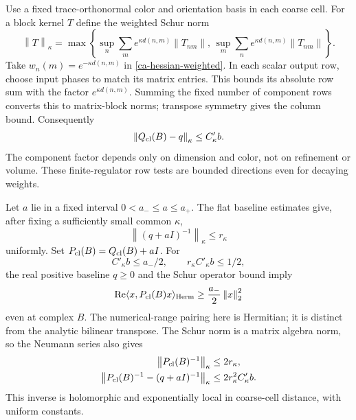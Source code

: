\documentclass[11pt]{article}
\theoremstyle{remark}
\newcommand{\norm}[1]{\left\|#1\right\|}
\begin{document}
Use a fixed trace-orthonormal color and orientation basis in
each coarse cell. For a block kernel $T$ define the weighted
Schur norm
\begin{equation}\label{ca-schur}
 \norm T_\kappa=\max\left\{
   \sup_n\sum_m e^{\kappa d(n,m)}\norm{T_{nm}},\,
   \sup_m\sum_n e^{\kappa d(n,m)}\norm{T_{nm}}\right\}.
\end{equation}
Take $w_n(m)=e^{-\kappa d(n,m)}$ in
\eqref{ca-hessian-weighted}. In each scalar output row,
choose input phases to match its matrix entries. This bounds
its absolute row sum with the factor $e^{\kappa d(n,m)}$.
Summing the fixed number of component rows converts this to
matrix-block norms; transpose symmetry gives the column bound.
Consequently
\begin{equation}\label{ca-hessian-schur}
 \norm{Q_{\rm cl}(B)-q}_\kappa\le C'_{\kappa}b.
\end{equation}
The component factor depends only on dimension and color,
not on refinement or volume. These finite-regulator row tests
are bounded directions even for decaying weights.

Let $a$ lie in a fixed interval $0<a_-\le a\le a_+$.
The flat baseline estimates give, after fixing a sufficiently
small common $\kappa$,
\begin{equation}\label{ca-baseline-inverse}
 \norm{(q+aI)^{-1}}_\kappa\le r_\kappa
\end{equation}
uniformly. Set $P_{\rm cl}(B)=Q_{\rm cl}(B)+aI$.
For
\begin{equation}\label{ca-inverse-radius}
 C'_\kappa b\le a_-/2,\qquad
 r_\kappa C'_\kappa b\le1/2,
\end{equation}
the real positive baseline $q\ge0$ and the Schur operator
bound imply
\begin{equation}\label{ca-accretivity}
 \operatorname{Re}\langle x,P_{\rm cl}(B)x\rangle_{\rm Herm}
                 \ge\frac{a_-}{2}\norm x_2^2
\end{equation}
even at complex $B$. The numerical-range pairing here is
Hermitian; it is distinct from the analytic bilinear transpose.
The Schur norm is a matrix algebra norm, so the Neumann series
also gives
\begin{equation}\label{ca-inverse-bounds}
 \begin{split}
 \norm{P_{\rm cl}(B)^{-1}}_\kappa&\le2r_\kappa,\\
 \norm{P_{\rm cl}(B)^{-1}-(q+aI)^{-1}}_\kappa
                         &\le2r_\kappa^2C'_\kappa b.
 \end{split}
\end{equation}
This inverse is holomorphic and exponentially local in
coarse-cell distance, with uniform constants.
\end{document}
